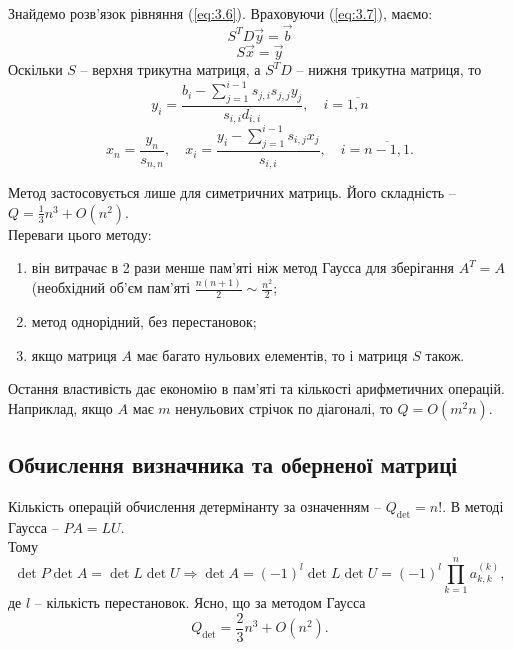 \documentclass[12pt, a4paper]{article}
\theoremstyle{definition}
\newcommand{\Sum}{\displaystyle\sum\limits}
\newcommand{\Prod}{\displaystyle\prod\limits}
\numberwithin{equation}{section}
\begin{document}
Знайдемо розв’язок рівняння (\ref{eq:3.6}). Враховуючи (\ref{eq:3.7}), маємо:
\begin{equation}
	\label{eq:3.9}
	S^T D \vec y = \vec b
\end{equation}
\begin{equation}
	\label{eq:3.10}
	S \vec x = \vec y
\end{equation}
Оскільки $S$ -- верхня трикутна матриця, а $S^TD$ -- нижня трикутна матриця, то
\begin{equation}
	\label{eq:3.11}
	y_i = \dfrac{b_i - \Sum_{j=1}^{i-1} s_{j,i}s_{j,j}y_j}{s_{i,i}d_{i,i}}, \quad i=\overline{1,n}
\end{equation}
\begin{equation}
	\label{eq:3.12}
	x_n = \dfrac{y_n}{s_{n,n}}, \quad x_i = \dfrac{y_i - \Sum_{j=1}^{i-1} s_{i,j} x_j}{s_{i,i}}, \quad i=\overline{n-1,1}.
\end{equation}

Метод застосовується лише для симетричних матриць. Його складність -- $Q = \frac13 n^3 + O(n^2)$. \\

Переваги цього методу:
\begin{enumerate}
	\item він витрачає в 2 рази менше пам'яті ніж метод Гаусса для зберігання $A^T = A$ (необхідний об'єм пам'яті $\frac{n(n+1)}{2} \sim \frac{n^2}{2}$;
	\item метод однорідний, без перестановок;
	\item якщо матриця $A$ має багато нульових елементів, то і матриця $S$ також.
\end{enumerate}
Остання властивість дає економію в пам'яті та кількості арифметичних операцій. Наприклад, якщо $A$ має $m$ ненульових стрічок по діагоналі, то $Q = O(m^2n)$.

\subsection{Обчислення визначника та оберненої матриці}

Кількість операцій обчислення детермінанту за означенням -- $Q_{\det} = n!$. В методі Гаусса -- $PA = LU$. \\

Тому 
\begin{equation}
	\label{eq:3.13} 
	\det P \det A = \det L \det U \Rightarrow \det A = (-1)^l \det L \det U = (-1)^l \Prod_{k=1}^n a_{k,k}^{(k)},
\end{equation}
де $l$ -- кількість перестановок. Ясно, що за методом Гаусса \[Q_{\det} = \dfrac 23 n^3 + O (n^2) .\]
\end{document}
